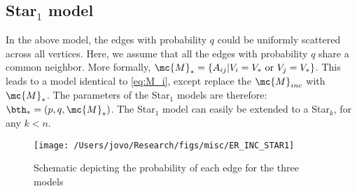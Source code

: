 
\subsection{Star$_1$  model} %
\label{ssub:incoherent_subspace}

In the above model, the edges with probability $q$ could be uniformly scattered across all vertices.  Here, we assume that all the edges with probability $q$ share a common neighbor.  More formally, $\mc{M}_*=\{A_{ij} | V_i = V_* \text{ or } V_j = V_*\}$.  This leads to a model identical to \eqref{eq:M_i}, except replace the $\mc{M}_{inc}$ with $\mc{M}_*$. The parameters of the Star$_1$ models are therefore: $\bth_{*}=(p,q,\mc{M}_*)$.  The Star$_1$ model can easily be extended to a Star$_k$, for any $k < n$. 

\begin{figure}[h!]
\centering \texttt{[image: /Users/jovo/Research/figs/misc/ER\_INC\_STAR1]}
\caption{Schematic depicting the probability of each edge for the three models}
\label{fig:models}
\end{figure}





